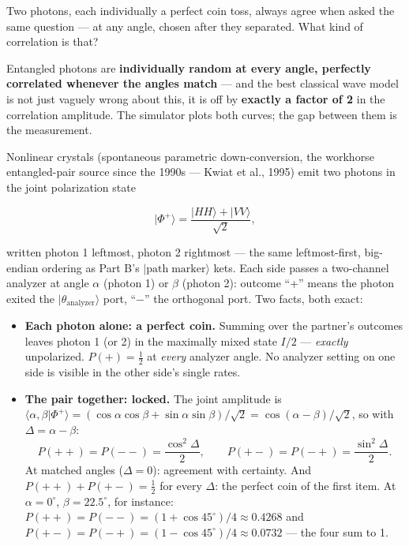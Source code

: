 \documentclass[a4paper,11pt]{article}
\providecommand{\ket}[1]{|#1\rangle}
\providecommand{\braket}[2]{\langle#1|#2\rangle}
\begin{document}
\begin{questionbox}
Two photons, each individually a perfect coin toss, always agree when asked the same
question --- at any angle, chosen after they separated. What kind of correlation is
that?
\end{questionbox}

\begin{shockbox}
Entangled photons are \textbf{individually random at every angle, perfectly
correlated whenever the angles match} --- and the best classical wave model is not
just vaguely wrong about this, it is off by \textbf{exactly a factor of 2} in the
correlation amplitude. The simulator plots both curves; the gap between them is the
measurement.
\end{shockbox}

Nonlinear crystals (spontaneous parametric down-conversion, the workhorse
entangled-pair source since the 1990s --- Kwiat et al., 1995) emit two photons in the
joint polarization state

\begin{equation}
    \ket{\Phi^{+}} = \frac{\ket{HH} + \ket{VV}}{\sqrt 2},
    \label{eq:pairstate}
\end{equation}

\noindent written photon 1 leftmost, photon 2 rightmost --- the same leftmost-first,
big-endian ordering as Part B's $\ket{\text{path}\;\text{marker}}$ kets. Each side
passes a two-channel analyzer at angle $\alpha$ (photon 1) or $\beta$ (photon 2):
outcome ``+'' means the photon exited the $\ket{\theta_{\text{analyzer}}}$ port,
``$-$'' the orthogonal port. Two facts, both exact:

\begin{itemize}
    \item \textbf{Each photon alone: a perfect coin.} Summing over the partner's
          outcomes leaves photon 1 (or 2) in the maximally mixed state $I/2$ ---
          \emph{exactly} unpolarized. $P(+) = \tfrac12$ at \emph{every} analyzer
          angle. No analyzer setting on one side is visible in the other side's
          single rates.
    \item \textbf{The pair together: locked.} The joint amplitude is
          $\braket{\alpha, \beta}{\Phi^{+}}
          = (\cos\alpha\cos\beta + \sin\alpha\sin\beta)/\sqrt 2
          = \cos(\alpha - \beta)/\sqrt 2$, so with $\Delta = \alpha - \beta$:
          \begin{equation}
              P({+}{+}) = P({-}{-}) = \frac{\cos^2\Delta}{2},
              \qquad
              P({+}{-}) = P({-}{+}) = \frac{\sin^2\Delta}{2}.
              \label{eq:jointprobs}
          \end{equation}
          At matched angles ($\Delta = 0$): agreement with certainty. And
          $P({+}{+}) + P({+}{-}) = \tfrac12$ for every $\Delta$: the perfect coin of the first
          item. At
          $\alpha = 0^\circ$, $\beta = 22.5^\circ$, for instance:
          $P({+}{+}) = P({-}{-}) = (1 + \cos 45^\circ)/4 \approx 0.4268$ and
          $P({+}{-}) = P({-}{+}) = (1 - \cos 45^\circ)/4 \approx 0.0732$ --- the
          four sum to 1.
\end{itemize}
\end{document}
